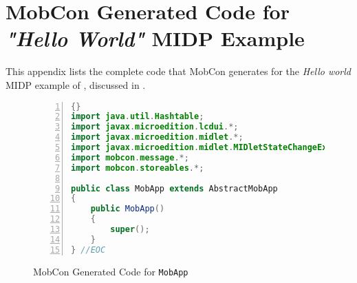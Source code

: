 \chapter{MobCon Generated Code for \textit{"Hello World"} MIDP Example}
\label{ch.hello.example}

This appendix lists the complete code that MobCon generates for the \textit{Hello world} MIDP example of , discussed in .

\begin{figure}[ht]
	\begin{center}
	\begin{minipage}{6cm}
		\begin{scriptsize}
\begin{lstlisting}[numbers=left,language=Java,frame=leftline,showstringspaces=false]{}
import java.util.Hashtable;
import javax.microedition.lcdui.*;
import javax.microedition.midlet.*;
import javax.microedition.midlet.MIDletStateChangeException;
import mobcon.message.*;
import mobcon.storeables.*;

public class MobApp extends AbstractMobApp
{
	public MobApp()
	{
		super();
	}
} //EOC
\end{lstlisting}
		\end{scriptsize}
		\end{minipage}
	\end{center}
	\caption{MobCon Generated Code for \texttt{MobApp}}
\label{fig:mc.app}
\end{figure}

